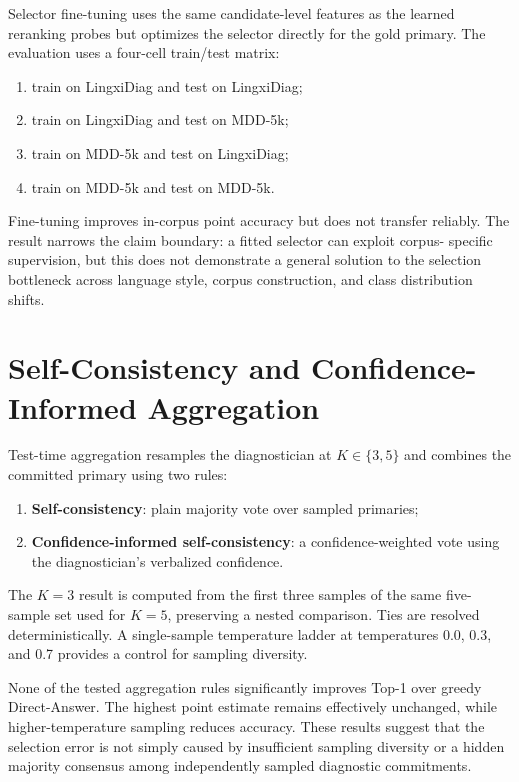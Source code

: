 Selector fine-tuning uses the same candidate-level features as the learned
reranking probes but optimizes the selector directly for the gold primary. The
evaluation uses a four-cell train/test matrix:

\begin{enumerate}
  \item train on LingxiDiag and test on LingxiDiag;
  \item train on LingxiDiag and test on MDD-5k;
  \item train on MDD-5k and test on LingxiDiag;
  \item train on MDD-5k and test on MDD-5k.
\end{enumerate}

Fine-tuning improves in-corpus point accuracy but does not transfer reliably.
The result narrows the claim boundary: a fitted selector can exploit corpus-
specific supervision, but this does not demonstrate a general solution to the
selection bottleneck across language style, corpus construction, and class
distribution shifts.

\section{Self-Consistency and Confidence-Informed Aggregation}
\label{app:selfconsistency}

Test-time aggregation resamples the diagnostician at
$K\in\{3,5\}$ and combines the committed primary using two rules:

\begin{enumerate}
  \item \textbf{Self-consistency}: plain majority vote over sampled primaries;
  \item \textbf{Confidence-informed self-consistency}: a confidence-weighted
        vote using the diagnostician's verbalized confidence.
\end{enumerate}

The $K=3$ result is computed from the first three samples of the same
five-sample set used for $K=5$, preserving a nested comparison. Ties are
resolved deterministically. A single-sample temperature ladder at
temperatures 0.0, 0.3, and 0.7 provides a control for sampling diversity.

None of the tested aggregation rules significantly improves Top-1 over greedy
Direct-Answer. The highest point estimate remains effectively unchanged, while
higher-temperature sampling reduces accuracy. These results suggest that the
selection error is not simply caused by insufficient sampling diversity or a
hidden majority consensus among independently sampled diagnostic commitments.

